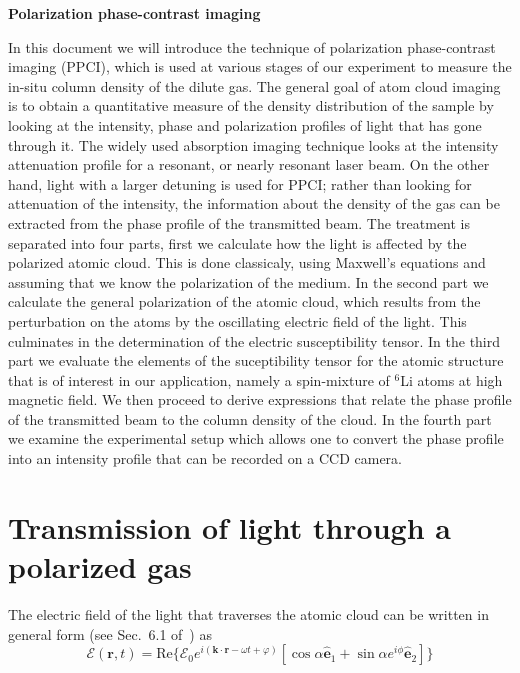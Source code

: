 \documentclass[11pt,letter]{article}
\newcommand{\bv}[1]{\ensuremath{\bm{#1}}}
\newcommand{\efield}{\ensuremath{\bv{\mathcal{E}}}}
\newcommand{\efieldo}{\ensuremath{\mathcal{E}_{0}}}
\begin{document}
{\Large \bf Polarization phase-contrast imaging}

In this document we will introduce the technique of polarization phase-contrast
imaging (PPCI), which is used at various stages of our experiment to measure
the in-situ column density of the dilute gas.   The general goal of atom
cloud imaging is to obtain a quantitative measure of the density distribution
of the sample by looking at the intensity, phase and polarization profiles of
light that has gone through it.    The widely used absorption imaging
technique looks at the intensity attenuation profile for a resonant, or nearly
resonant laser beam.   On the other hand, light with a larger detuning is used
for PPCI; rather than looking for attenuation of the intensity, the information
about the density of the gas can be extracted from the phase profile of the
transmitted beam.   The treatment is separated into four parts, first we
calculate how the light is affected by the polarized atomic cloud.  This is
done classicaly, using Maxwell's equations and assuming that we know the
polarization of the medium.  In the second part we calculate the general
polarization of the atomic cloud, which results from the perturbation on the
atoms by the oscillating electric field of the light. This culminates in the
determination of the electric susceptibility tensor.  In the third part we
evaluate the elements of the suceptibility tensor for the atomic structure that
is of interest in our application, namely a spin-mixture of $^{6}$Li atoms at
high magnetic field.  We then proceed to derive expressions that relate the
phase profile of the transmitted beam to the column density of the cloud.
In the fourth part we examine the experimental setup which allows one to
convert the phase profile into an intensity profile that can be recorded on a
CCD camera.  
 
\section{Transmission of light through a polarized gas} 

The electric field of the light that traverses the atomic cloud can be written
in general form (see Sec.~6.1 of~\cite{auzinsh2010optically}) as 
\begin{equation}
 \efield( \bv{r}, t ) = 
     \text{Re}\lbrace \efieldo e^{i(\bv{k}\cdot\bv{r} - \omega t + \varphi )} 
     [ \cos\alpha \bv{\hat{e}}_{1} 
   +   \sin\alpha e^{i\phi} \bv{\hat{e}}_{2} ] \rbrace 
\end{equation}
\end{document}
